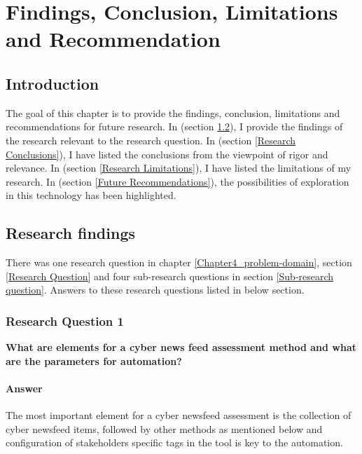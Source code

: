
\chapter{Findings, Conclusion, Limitations and Recommendation} %

\label{Chapter10_conclusion-recommendation} %

\section{Introduction }
 The goal of this chapter is to  provide the findings, conclusion, limitations  and recommendations for future research. 
 In  (section \ref{Research findings}), 
 I provide the findings of the research relevant to the research question. 
 In  (section \ref{Research Conclusions}), 
 I have listed the conclusions from the viewpoint of rigor and relevance.
 In  (section \ref{Research Limitations}), 
 I have listed the limitations of my research.  
 In  (section \ref{Future Recommendations}),
 the possibilities of exploration in this technology has been highlighted.
 
 
 \section{Research findings}\label{Research findings}
 There was one research question in chapter  \ref{Chapter4_problem-domain},  section \ref{Research Question} and four sub-research questions in section \ref{Sub-research question}. Answers to these research questions listed in below section.
 
 \subsection{Research Question 1}
 \textbf{What  are  elements  for  a  cyber news feed  assessment  method  and  what  are  the parameters for automation?}
 \subsubsection{Answer}
The most important element for a cyber newsfeed assessment is the collection of cyber newsfeed items, followed by other methods as mentioned below and configuration of stakeholders specific tags in the tool is key to the automation. 

